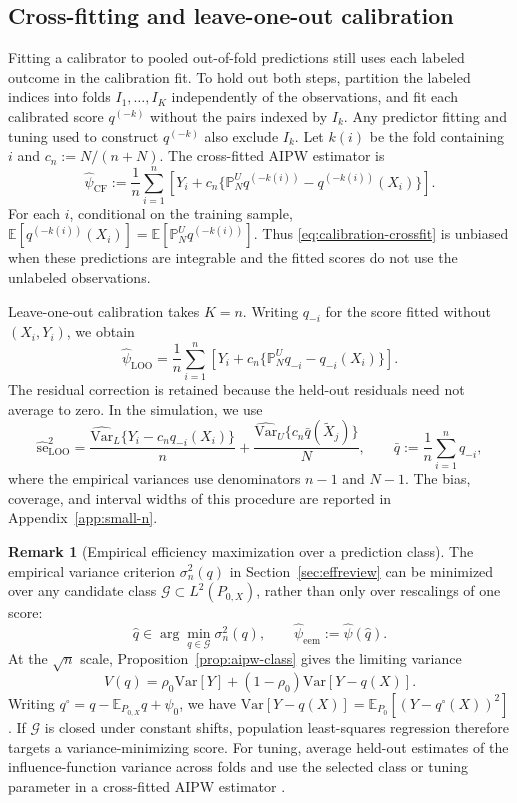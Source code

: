 \documentclass{article}
\theoremstyle{plain}
\theoremstyle{definition}
\newtheorem{remark}{Remark}
\newcommand{\E}{\mathbb{E}}
\newcommand{\Var}{\mathrm{Var}}
\newcommand{\1}{\mathbf{1}}
\newcommand{\rhozero}{\rho_0}
\newcommand{\Pu}{\mathbb{P}^{U}_N}
\newcommand{\Px}{P_{0,X}}
\begin{document}
\subsection{Cross-fitting and leave-one-out calibration}
\label{sec:crossfit}

Fitting a calibrator to pooled out-of-fold predictions still uses each labeled
outcome in the calibration fit. To hold out both steps, partition the labeled
indices into folds \(I_1,\ldots,I_K\) independently of the observations, and
fit each calibrated score \(q^{(-k)}\) without the pairs indexed by \(I_k\).
Any predictor fitting and tuning used to construct \(q^{(-k)}\) also exclude
\(I_k\). Let \(k(i)\) be the fold containing \(i\) and
\(c_n:=N/(n+N)\). The cross-fitted AIPW estimator is
\begin{equation}
\label{eq:calibration-crossfit}
\widehat\psi_{\mathrm{CF}}
:=\frac1n\sum_{i=1}^n
\left[Y_i+c_n\{\Pu q^{(-k(i))}-q^{(-k(i))}(X_i)\}\right].
\end{equation}
For each \(i\), conditional on the training sample,
\(\E[q^{(-k(i))}(X_i)]=\E[\Pu q^{(-k(i))}]\).
Thus \eqref{eq:calibration-crossfit} is unbiased when these predictions are
integrable and the fitted scores do not use the unlabeled observations.

Leave-one-out calibration takes \(K=n\). Writing \(q_{-i}\) for the score
fitted without \((X_i,Y_i)\), we obtain
\begin{equation}
\label{eq:calibration-loo}
\widehat\psi_{\mathrm{LOO}}
=\frac1n\sum_{i=1}^n
\left[Y_i+c_n\{\Pu q_{-i}-q_{-i}(X_i)\}\right].
\end{equation}
The residual correction is retained because the held-out residuals need not
average to zero. In the simulation, we use
\begin{equation}
\label{eq:loo-se}
\widehat{\mathrm{se}}_{\mathrm{LOO}}^2
=\frac{\widehat{\Var}_L\{Y_i-c_nq_{-i}(X_i)\}}{n}
+\frac{\widehat{\Var}_U\{c_n\bar q(\widetilde X_j)\}}{N},
\qquad \bar q:=\frac1n\sum_{i=1}^n q_{-i},
\end{equation}
where the empirical variances use denominators \(n-1\) and \(N-1\).
The bias, coverage, and interval widths of this procedure are reported in
Appendix~\ref{app:small-n}.

\begin{remark}[Empirical efficiency maximization over a prediction class]
The empirical variance criterion \(\sigma_n^2(q)\) in
Section~\ref{sec:effreview} can be minimized over any candidate class
\(\mathcal G\subset L^2(\Px)\), rather than only over rescalings of one score:
\[
\hat q\in\arg\min_{q\in\mathcal G}\sigma_n^2(q),
\qquad
\widehat\psi_{\mathrm{eem}}:=\widehat\psi(\hat q).
\]
At the \(\sqrt n\) scale, Proposition~\ref{prop:aipw-class} gives the limiting variance
\[
V(q)=\rhozero\Var[Y]+(1-\rhozero)\Var[Y-q(X)].
\]
Writing \(q^\circ=q-\E_{\Px}q+\psi_0\), we have
\(\Var[Y-q(X)]=\E_{P_0}[(Y-q^\circ(X))^2]\).
If \(\mathcal G\) is closed under constant shifts, population least-squares
regression therefore targets a variance-minimizing score.
For tuning, average held-out estimates of the influence-function variance
across folds and use the selected class or tuning parameter in a cross-fitted
AIPW estimator \citep{rubin2008empirical}.
\end{remark}
\end{document}
